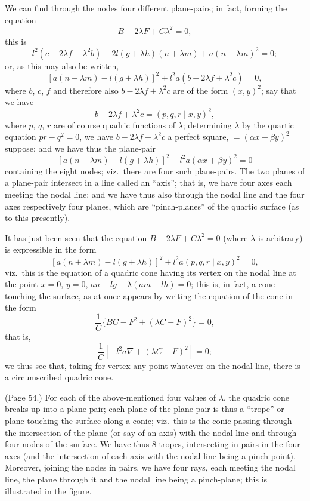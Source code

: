 \documentclass[11pt,a4paper]{article}
\begin{document}
We can find through the nodes four different plane-pairs; in fact, forming the equation
\[
B - 2\lambda F + C \lambda^2 = 0,
\]
this is
\[
l^2 (c + 2\lambda f + \lambda^2 b) - 2l(g + \lambda h)(n + \lambda m) + a(n + \lambda m)^2 = 0;
\]
or, as this may also be written,
\[
[a(n + \lambda m) - l(g + \lambda h)]^2 + l^2 a (b - 2\lambda f + \lambda^2 c) = 0,
\]
where $b$, $c$, $f$ and therefore also $b - 2\lambda f + \lambda^2 c$ are of the form $(x, y)^2$; say that we have
\[
b - 2\lambda f + \lambda^2 c = (p, q, r \mid x, y)^2,
\]
where $p$, $q$, $r$ are of course quadric functions of $\lambda$; determining $\lambda$ by the quartic equation $pr - q^2 = 0$, we have $b - 2\lambda f + \lambda^2 c$ a perfect square, $= (\alpha x + \beta y)^2$ suppose; and we have thus the plane-pair
\[
[a(n + \lambda m) - l(g + \lambda h)]^2 - l^2 a (\alpha x + \beta y)^2 = 0
\]
containing the eight nodes; viz.\ there are four such plane-pairs. The two planes of a plane-pair intersect in a line called an ``axis''; that is, we have four axes each meeting the nodal line; and we have thus also through the nodal line and the four axes respectively four planes, which are ``pinch-planes'' of the quartic surface (as to this presently).

It has just been seen that the equation $B - 2\lambda F + C \lambda^2 = 0$ (where $\lambda$ is arbitrary) is expressible in the form
\[
[a(n + \lambda m) - l(g + \lambda h)]^2 + l^2 a (p, q, r \mid x, y)^2 = 0,
\]
viz.\ this is the equation of a quadric cone having its vertex on the nodal line at the point $x = 0$, $y = 0$, $an - lg + \lambda(am - lh) = 0$; this is, in fact, a cone touching the surface, as at once appears by writing the equation of the cone in the form
\[
\frac{1}{C} \{BC - F^2 + (\lambda C - F)^2\} = 0,
\]
that is,
\[
\frac{1}{C} [-l^2 a \nabla + (\lambda C - F)^2] = 0;
\]
we thus see that, taking for vertex any point whatever on the nodal line, there is a circumscribed quadric cone.

\bigskip

\noindent (Page 54.) For each of the above-mentioned four values of $\lambda$, the quadric cone breaks up into a plane-pair; each plane of the plane-pair is thus a ``trope'' or plane touching the surface along a conic; viz.\ this is the conic passing through the intersection of the plane (or say of an axis) with the nodal line and through four nodes of the surface. We have thus $8$ tropes, intersecting in pairs in the four axes (and the intersection of each axis with the nodal line being a pinch-point). Moreover, joining the nodes in pairs, we have four rays, each meeting the nodal line, the plane through it and the nodal line being a pinch-plane; this is illustrated in the figure.
\end{document}
